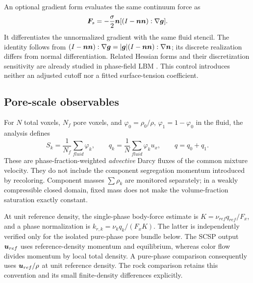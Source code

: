 An optional gradient form evaluates the same continuum force as
\begin{equation}
 \bm{F}_s=-\frac{\sigma}{2}\bm{n}
       [(I-\bm{n}\bm{n}):\nabla\bm{g}].
\end{equation}
It differentiates the unnormalized gradient with the same fluid stencil.
The identity follows from
$(I-\bm{n}\bm{n}):\nabla\bm{g}=|\bm{g}|(I-\bm{n}\bm{n}):\nabla\bm{n}$;
its discrete realization differs from normal differentiation.
Related Hessian forms and their discretization sensitivity are already
studied in phase-field LBM \cite{sugimoto2026}. This control introduces
neither an adjusted cutoff nor a fitted surface-tension coefficient.

\subsection{Pore-scale observables}
For $N$ total voxels, $N_f$ pore voxels, and $\varphi_0=\rho_0/\rho$,
$\varphi_1=1-\varphi_0$ in the fluid, the analysis defines
\begin{equation}
 S_k=\frac{1}{N_f}\sum_{fluid}\varphi_k,\qquad
 q_k=\frac{1}{N}\sum_{fluid}\varphi_k u_x,\qquad q=q_0+q_1.
\end{equation}
These are phase-fraction-weighted \emph{advective} Darcy fluxes of the common
mixture velocity. They do not include the component segregation momentum
introduced by recoloring. Component masses $\sum\rho_k$ are monitored
separately; in a weakly compressible closed domain, fixed mass does not make
the volume-fraction saturation exactly constant.

At unit reference density, the single-phase body-force estimate is
$K=\nu_{ref}q_{ref}/F_x$, and a phase normalization is
$k_{r,k}=\nu_kq_k/(F_xK)$. The latter is independently verified only for the
isolated pure-phase pore bundle below. The SCSP output $\bm{u}_{ref}$ uses
reference-density momentum and equilibrium, whereas color flow divides
momentum by local total density. A pure-phase comparison consequently uses
$\bm{u}_{ref}/\rho$ at unit reference density. The rock comparison retains
this convention and its small finite-density differences explicitly.

